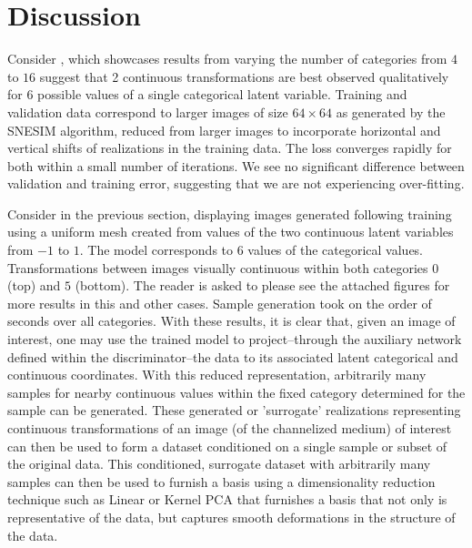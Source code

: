 \documentclass{article}
\begin{document}
\section{Discussion}

	Consider \label{cat6samples}, which showcases results from varying the number of categories from $4$ to $16$ suggest that 2 continuous transformations are best observed qualitatively for $6$ possible values of a single categorical latent variable.  Training and validation data correspond to larger images of size $64 \times 64$ as generated by the SNESIM algorithm, reduced from larger images to incorporate horizontal and vertical shifts of realizations in the training data.  The loss converges rapidly for both within a small number of iterations.  We see no significant difference between validation and training error, suggesting that we are not experiencing over-fitting.

	Consider \label{cat6gd} in the previous section, displaying images generated following training using a uniform mesh created from values of the  two continuous latent variables from $-1$ to $1$.  The model corresponds to $6$ values of the categorical values.  Transformations between images visually continuous within both categories $0$ (top) and $5$ (bottom).  The reader is asked to please see the attached figures for more results in this and other cases. Sample generation took on the order of seconds over all categories. 
    With these results, it is clear that, given an image of interest, one may use the trained model to project--through the auxiliary network defined within the discriminator--the data to its associated latent categorical and continuous coordinates.  With this reduced representation, arbitrarily many samples for nearby continuous values within the fixed category determined for the sample can be generated.  These generated or 'surrogate' realizations representing continuous transformations of an image (of the channelized medium) of interest can then be used to form a dataset conditioned on a single sample or subset of the original data.  This conditioned, surrogate dataset with arbitrarily many samples can then be used to furnish a basis using a dimensionality reduction technique such as Linear or Kernel PCA that furnishes a basis that not only is representative of the data, but captures smooth deformations in the structure of the data. 
    
\end{document}
